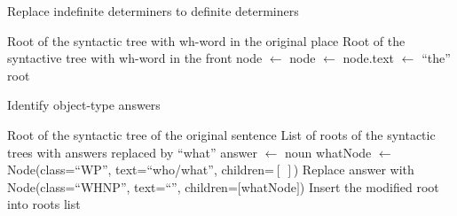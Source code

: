 \begin{algorithm}
\caption{Replace indefinite determiners to definite determiners}
\label{alg:indef2def}
\begin{algorithmic}[1]
\Require Root of the syntactic tree with wh-word in the original place
\Ensure Root of the syntactive tree with wh-word in the front
\State node $\gets$  
\State node $\gets$  
    \State node.text $\gets$ ``the''
\EndIf
\State \Return root
\EndProcedure
\end{algorithmic}
\end{algorithm}

\begin{algorithm}
\caption{Identify object-type answers}
\label{alg:traverseWhat}
\begin{algorithmic}[1]
\Require Root of the syntactic tree of the original sentence
\Ensure List of roots of the syntactic trees with answers replaced by ``what''
    \State {}
\EndFor
{}
    \State answer $\gets$ noun
    \State whatNode $\gets$ Node(class=``WP'', text=``who/what'', children=$[\ ]$)
    \State Replace answer with Node(class=``WHNP'', text=``'',  children=$[$whatNode$]$)
    \State Insert the modified root into roots list
\EndIf
\EndProcedure
\end{algorithmic}
\end{algorithm}

